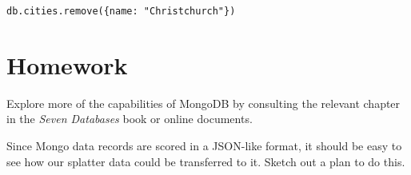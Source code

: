 \documentclass{article}
\begin{document}
\texttt{db.cities.remove(\{name: "Christchurch"\})}

\section{Homework}
Explore more of the capabilities of MongoDB by consulting the relevant chapter in the \emph{Seven Databases} book or online documents.

Since Mongo data records are scored in a JSON-like format, it should be easy to see how our splatter data could be transferred to it.  Sketch out a plan to do this.
\end{document}
